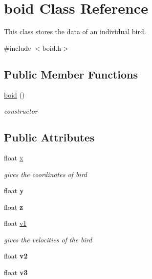 \hypertarget{classboid}{}\section{boid Class Reference}
\label{classboid}


This class stores the data of an individual bird.  




{\ttfamily \#include $<$boid.\+h$>$}

\subsection*{Public Member Functions}
\begin{DoxyCompactItemize}
\item 
\mbox{\label{classboid_a66be2fb9f12b5296304957759ded821a}} 
\mbox{\hyperlink{classboid_a66be2fb9f12b5296304957759ded821a}{boid}} ()
\begin{DoxyCompactList}\small\item\em constructor \end{DoxyCompactList}\end{DoxyCompactItemize}
\subsection*{Public Attributes}
\begin{DoxyCompactItemize}
\item 
\mbox{\label{classboid_a9b81568e352fd264d24360335ea2617e}} 
float \mbox{\hyperlink{classboid_a9b81568e352fd264d24360335ea2617e}{x}}
\begin{DoxyCompactList}\small\item\em gives the coordinates of bird \end{DoxyCompactList}\item 
\mbox{\label{classboid_a62f0a12fa7de3d84a1ecc90a4e2fad06}} 
float {\bfseries y}
\item 
\mbox{\label{classboid_a6a261164dfe033b386b329e2c090697c}} 
float {\bfseries z}
\item 
\mbox{\label{classboid_a40b076c42c61913327fee7f0d673cca8}} 
float \mbox{\hyperlink{classboid_a40b076c42c61913327fee7f0d673cca8}{v1}}
\begin{DoxyCompactList}\small\item\em gives the velocities of the bird \end{DoxyCompactList}\item 
\mbox{\label{classboid_a4fe658ea13e1d1fad75cfa182efb7540}} 
float {\bfseries v2}
\item 
\mbox{\label{classboid_a71780d5fbdad3751c97a84e6f1f7fd28}} 
float {\bfseries v3}
\end{DoxyCompactItemize}



